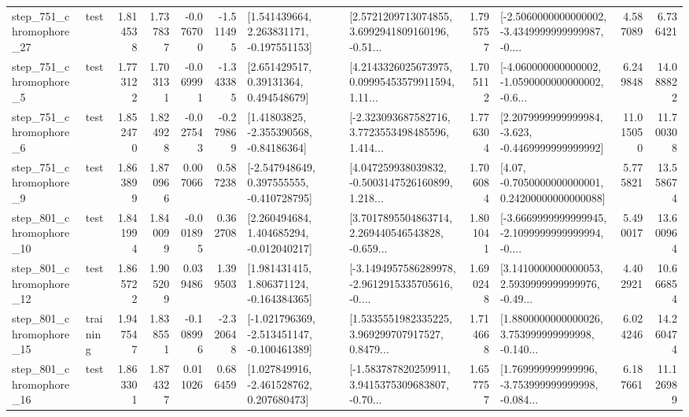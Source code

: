 \begin{tabular}{llrrrrllrlrr}
  step\_751\_chromophore\_27 &      test &      1.814538 &    1.737837 &     -0.076700 & -1.511495 &    [1.541439664, 2.263831171, -0.197551153] &  [2.5721209713074855, 3.6992941809160196, -0.51... &       1.795757 &  [-2.5060000000000002, -3.4349999999999987, -0.... &            4.587089 &          6.736421 \\
   step\_751\_chromophore\_5 &      test &      1.773122 &    1.703131 &     -0.069991 & -1.343385 &      [2.651429517, 0.39131364, 0.494548679] &  [4.2143326025673975, 0.09995453579911594, 1.11... &       1.705112 &  [-4.060000000000002, -1.0590000000000002, -0.6... &            6.249848 &         14.088822 \\
   step\_751\_chromophore\_6 &      test &      1.852470 &    1.824928 &     -0.027543 & -0.279869 &     [1.41803825, -2.355390568, -0.84186364] &  [-2.323093687582716, 3.7723553498485596, 1.414... &       1.776304 &  [2.2079999999999984, -3.623, -0.4469999999999992] &           11.015050 &         11.700308 \\
   step\_751\_chromophore\_9 &      test &      1.863899 &    1.870966 &      0.007066 &  0.587238 &   [-2.547948649, 0.397555555, -0.410728795] &  [4.047259938039832, -0.5003147526160899, 1.218... &       1.706084 &   [4.07, -0.7050000000000001, 0.24200000000000088] &            5.775821 &         13.558674 \\
  step\_801\_chromophore\_10 &      test &      1.841994 &    1.840099 &     -0.001895 &  0.362708 &    [2.260494684, 1.404685294, -0.012040217] &  [3.7017895504863714, 2.269440546543828, -0.659... &       1.801041 &  [-3.6669999999999945, -2.1099999999999994, -0.... &            5.490017 &         13.600964 \\
  step\_801\_chromophore\_12 &      test &      1.865722 &    1.905209 &      0.039486 &  1.399503 &    [1.981431415, 1.806371124, -0.164384365] &  [-3.1494957586289978, -2.9612915335705616, -0.... &       1.690248 &  [3.1410000000000053, 2.5939999999999976, -0.49... &            4.402921 &         10.666854 \\
  step\_801\_chromophore\_15 &  training &      1.947547 &    1.838551 &     -0.108996 & -2.320648 &  [-1.021796369, -2.513451147, -0.100461389] &  [1.5335551982335225, 3.969299707917527, 0.8479... &       1.714668 &  [1.8800000000000026, 3.753999999999998, -0.140... &            6.024246 &         14.260474 \\
  step\_801\_chromophore\_16 &      test &      1.863301 &    1.874327 &      0.011026 &  0.686459 &    [1.027849916, -2.461528762, 0.207680473] &  [-1.583787820259911, 3.9415375309683807, -0.70... &       1.657757 &  [1.769999999999996, -3.753999999999998, -0.084... &            6.187661 &         11.126989 \\

\end{tabular}
